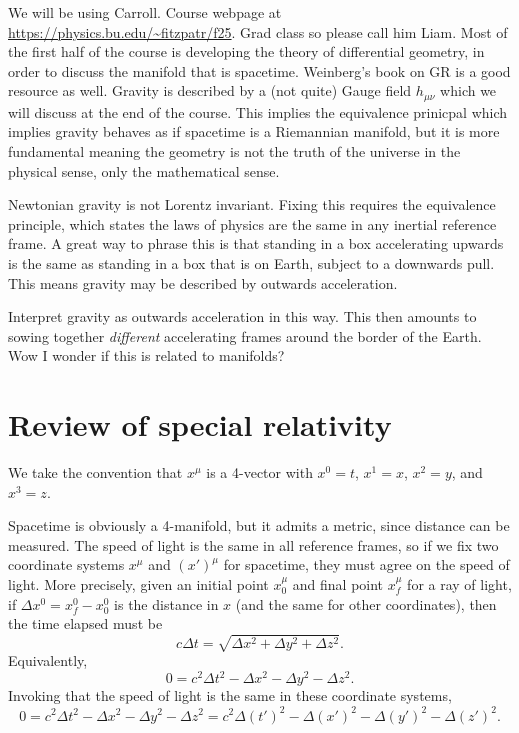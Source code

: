 
We will be using Carroll. Course webpage at \url{https://physics.bu.edu/~fitzpatr/f25}. Grad class so please call him Liam. Most of the first half of the course is developing the theory of differential geometry, in order to discuss the manifold that is spacetime. Weinberg's book on GR is a good resource as well. Gravity is described by a (not quite) Gauge field $h_{\mu \nu } $ which we will discuss at the end of the course. This implies the equivalence prinicpal which implies gravity behaves as if spacetime is a Riemannian manifold, but it is more fundamental meaning the geometry is not the truth of the universe in the physical sense, only the mathematical sense.

Newtonian gravity is not Lorentz invariant. Fixing this requires the equivalence principle, which states the laws of physics are the same in any inertial reference frame. A great way to phrase this is that standing in a box accelerating upwards is the same as standing in a box that is on Earth, subject to a downwards pull. This means gravity may be described by outwards acceleration.

Interpret gravity as outwards acceleration in this way. This then amounts to sowing together \emph{different} accelerating frames around the border of the Earth. Wow I wonder if this is related to manifolds?

\chapter{Review of special relativity}

We take the convention that $x^\mu $ is a 4-vector with $x^0=t$, $x^1=x$, $x^2=y$, and $x^3=z$.

Spacetime is obviously a 4-manifold, but it admits a metric, since distance can be measured. The speed of light is the same in all reference frames, so if we fix two coordinate systems $x^\mu $ and $(x')^\mu $ for spacetime, they must agree on the speed of light. More precisely, given an initial point $x_0^\mu $ and final point $x_f^\mu $ for a ray of light, if $\Delta x^0 =x_f^0-x_0^0$ is the distance in $x$ (and the same for other coordinates), then the time elapsed must be
\[
	c\Delta t = \sqrt{\Delta x^2+\Delta y^2+\Delta z^2} .
\]
Equivalently,
\[
	0=c^2\Delta t^2 - \Delta x^2 - \Delta y^2 - \Delta z^2
.\]
Invoking that the speed of light is the same in these coordinate systems,
\[
	0=c^2\Delta t^2 - \Delta x^2 - \Delta y^2 - \Delta z^2 = c^2 \Delta (t')^2 - \Delta (x')^2 - \Delta (y')^2 - \Delta (z')^2
.\]


